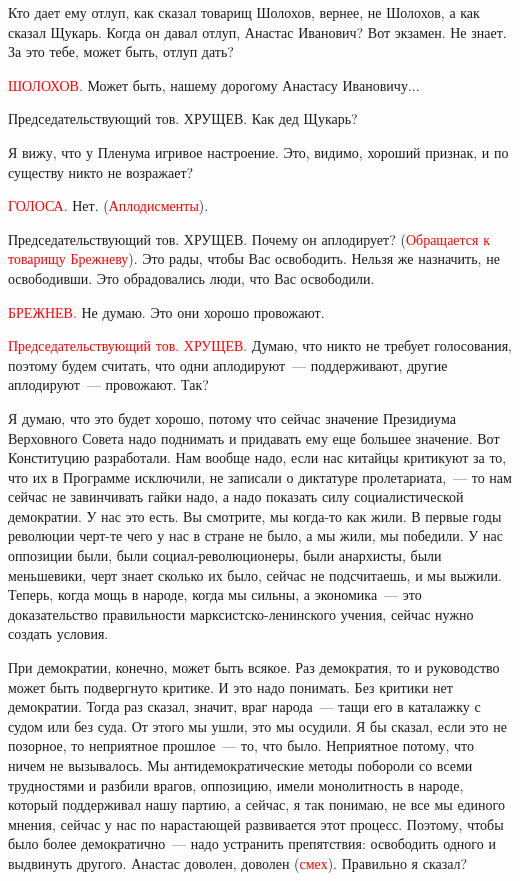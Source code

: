 \documentclass{kursa4}
\begin{document}
{{    {Кто дает ему отлуп, как сказал товарищ Шолохов,
    вернее, не Шолохов, а как сказал Щукарь. Когда он давал отлуп, Анастас
    Иванович? Вот экзамен. Не знает. За это тебе, может быть, отлуп дать?}

    \textcolor{red}{ШОЛОХОВ.}{
    Может быть, нашему дорогому Анастасу Ивановичу...}

    {Председательствующий тов. ХРУЩЕВ. Как дед Щукарь?}

    {Я вижу, что у Пленума игривое настроение. Это, видимо,
    хороший признак, и по существу никто не возражает?}

    \textcolor{red}{ГОЛОСА.}{
    Нет.
    (}\textcolor{red}{Аплодисменты}{).}

    {Председательствующий тов. ХРУЩЕВ. Почему он
    аплодирует? (}\textcolor{red}{Обращается к
    товарищу Брежневу}{). Это рады, чтобы Вас освободить.
    Нельзя же назначить, не освободивши. Это обрадовались люди, что Вас
    освободили.}

    \textcolor{red}{БРЕЖНЕВ.}{
    Не думаю. Это они хорошо провожают.}

    \textcolor{red}{Председательствующий тов.
    ХРУЩЕВ.}{ Думаю, что никто не требует голосования,
    поэтому будем считать, что одни аплодируют~--- поддерживают, другие
    аплодируют~--- провожают. Так?}

    {Я думаю, что это будет хорошо, потому что сейчас
    значение Президиума Верховного Совета надо поднимать и придавать ему
    еще большее значение. Вот Конституцию разработали. Нам вообще надо,
    если нас китайцы критикуют за то, что их в Программе исключили, не
    записали о диктатуре пролетариата,~--- то нам сейчас не завинчивать гайки
    надо, а надо показать силу социалистической демократии. У нас это есть.
    Вы смотрите, мы когда-то как жили. В первые годы революции черт-те чего
    у нас в стране не было, а мы жили, мы победили. У нас оппозиции были,
    были социал-революционеры, были анархисты, были меньшевики, черт знает
    сколько их было, сейчас не подсчитаешь, и мы выжили. Теперь, когда мощь
    в народе, }{когда мы сильны, а экономика~--- это
    доказательство правильности марксистско-ленинского учения, сейчас нужно
    создать условия.}

    {При демократии, конечно, может быть всякое. Раз
    демократия, то и руководство может быть подвергнуто критике. И это надо
    понимать. Без критики нет демократии. Тогда раз сказал, значит, враг
    народа~--- тащи его в каталажку с судом или без суда. От этого мы ушли,
    это мы осудили. Я бы сказал, если это не позорное, то неприятное
    прошлое~--- то, что было. Неприятное потому, что ничем не вызывалось. Мы
    антидемократические методы побороли со всеми трудностями и разбили
    врагов, оппозицию, имели монолитность в народе, который поддерживал
    нашу партию, а сейчас, я так понимаю, не все мы единого мнения, сейчас
    у нас по нарастающей развивается этот процесс. Поэтому, чтобы было
    более демократично~--- надо устранить препятствия: освободить одного и
    выдвинуть другого. Анастас доволен, доволен
    (}\textcolor{red}{смех}{).
    Правильно я сказал?}

}}
\end{document}
